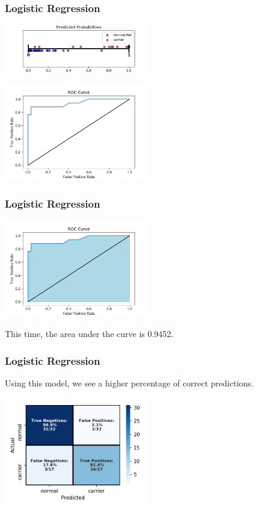 \documentclass[11pt, table]{beamer}
\begin{document}
\begin{frame}
\frametitle{Logistic Regression}
\begin{center}
	\includegraphics[width=2.5in]{images/Dystrophy/pred_proba_02.png}
\end{center}

\begin{center}
	\includegraphics[width=2.5in]{images/Dystrophy/roc_03.png}
\end{center}
\end{frame}

\begin{frame}
\frametitle{Logistic Regression}
\begin{center}
	\includegraphics[width=2.5in]{images/Dystrophy/roc_04.png}
\end{center}

This time, the area under the curve is 0.9452.
\end{frame}

\begin{frame}
\frametitle{Logistic Regression}
Using this model, we see a higher percentage of correct predictions.

\begin{center}
	\includegraphics[width=2.5in]{images/Dystrophy/cm_2.png}
\end{center}

\end{frame}
\end{document}
